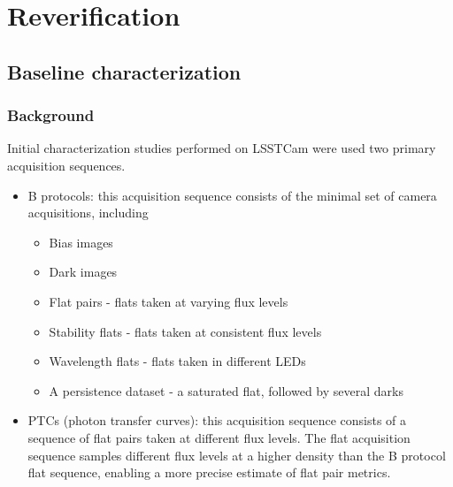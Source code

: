 \section{Reverification}\label{reverification}

\subsection{Baseline characterization}\label{baseline-characterization}

\subsubsection{Background}\label{background}

Initial characterization studies performed on LSSTCam were used two
primary acquisition sequences.

\begin{itemize}
\tightlist
\item
  B protocols: this acquisition sequence consists of the minimal set of
  camera acquisitions, including

  \begin{itemize}
  \tightlist
  \item
    Bias images
  \item
    Dark images
  \item
    Flat pairs - flats taken at varying flux levels
  \item
    Stability flats - flats taken at consistent flux levels
  \item
    Wavelength flats - flats taken in different LEDs
  \item
    A persistence dataset - a saturated flat, followed by several darks
  \end{itemize}
\item
  PTCs (photon transfer curves): this acquisition sequence consists of a
  sequence of flat pairs taken at different flux levels. The flat
  acquisition sequence samples different flux levels at a higher density
  than the B protocol flat sequence, enabling a more precise estimate of
  flat pair metrics.
\end{itemize}

